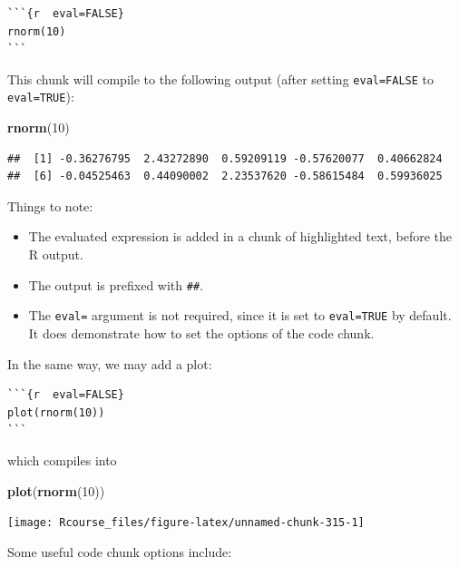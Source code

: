 \documentclass[]{book}
\newenvironment{Shaded}{\begin{snugshade}}{\end{snugshade}}
\newcommand{\KeywordTok}[1]{\textcolor[rgb]{0.13,0.29,0.53}{\textbf{#1}}}
\newcommand{\DecValTok}[1]{\textcolor[rgb]{0.00,0.00,0.81}{#1}}
\newcommand{\NormalTok}[1]{#1}
\providecommand{\tightlist}{%
  \setlength{\itemsep}{0pt}\setlength{\parskip}{0pt}}
\theoremstyle{definition}
\theoremstyle{definition}
\theoremstyle{definition}
\theoremstyle{remark}
\begin{document}
\begin{verbatim}
```{r  eval=FALSE}
rnorm(10)
```
\end{verbatim}

This chunk will compile to the following output (after setting
\texttt{eval=FALSE} to \texttt{eval=TRUE}):

\begin{Shaded}
\begin{Highlighting}[]
\KeywordTok{rnorm}\NormalTok{(}\DecValTok{10}\NormalTok{)}
\end{Highlighting}
\end{Shaded}

\begin{verbatim}
##  [1] -0.36276795  2.43272890  0.59209119 -0.57620077  0.40662824
##  [6] -0.04525463  0.44090002  2.23537620 -0.58615484  0.59936025
\end{verbatim}

Things to note:

\begin{itemize}
\tightlist
\item
  The evaluated expression is added in a chunk of highlighted text,
  before the R output.
\item
  The output is prefixed with \texttt{\#\#}.
\item
  The \texttt{eval=} argument is not required, since it is set to
  \texttt{eval=TRUE} by default. It does demonstrate how to set the
  options of the code chunk.
\end{itemize}

In the same way, we may add a plot:

\begin{verbatim}
```{r  eval=FALSE}
plot(rnorm(10))
```
\end{verbatim}

which compiles into

\begin{Shaded}
\begin{Highlighting}[]
\KeywordTok{plot}\NormalTok{(}\KeywordTok{rnorm}\NormalTok{(}\DecValTok{10}\NormalTok{))}
\end{Highlighting}
\end{Shaded}

\texttt{[image: Rcourse\_files/figure-latex/unnamed-chunk-315-1]}

Some useful code chunk options include:
\end{document}
